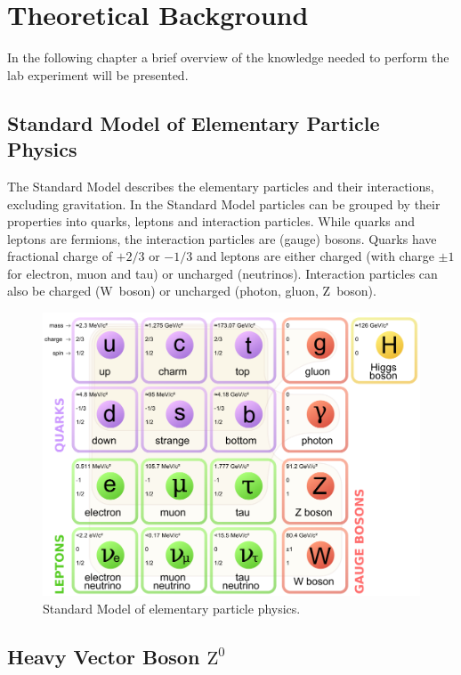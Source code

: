 \documentclass[11pt, a4paper]{article}
\numberwithin{equation}{section}
\begin{document}
\section{Theoretical Background}

In the following chapter a brief overview of the knowledge needed to perform the lab experiment will be presented.

\subsection{Standard Model of Elementary Particle Physics}

The Standard Model describes the elementary particles and their interactions, excluding gravitation.
In the Standard Model particles can be grouped by their properties into quarks, leptons and interaction particles.
While quarks and leptons are fermions, the interaction particles are (gauge) bosons.
Quarks have fractional charge of $+2/3$ or $-1/3$ and leptons are either charged (with charge $\pm1$ for electron, muon and tau) or uncharged (neutrinos).
Interaction particles can also be charged (W~boson) or uncharged (photon, gluon, Z~boson).
\begin{figure}[h]
	\centering
	\includegraphics[width=.8\textwidth]{./figures/theory/standardmodel}
	\caption{Standard Model of elementary particle physics\protect\footnotemark.}
	\label{fig:standard_model}
\end{figure}

\subsection{Heavy Vector Boson $\mathrm{Z}^0$}
\end{document}
